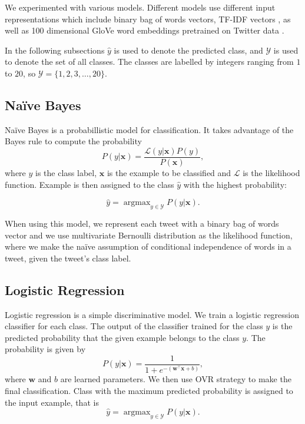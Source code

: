 \documentclass[10pt, a4paper]{article}
\DeclareMathOperator*{\argmax}{argmax}
\begin{document}
We experimented with various models. Different models use different input 
representations which include binary bag of words vectors, TF-IDF vectors 
\citep{manning2008introduction}, as well as 100 dimensional GloVe word 
embeddings pretrained on Twitter data \citep{pennington2014glove}.

In the following subsections $\hat{y}$ is used to denote the predicted class, 
and $\mathcal{Y}$ is used to denote the set of all classes. The classes are 
labelled by integers ranging from $1$ to $20$, so $\mathcal{Y} = \{1, 2, 3,
\ldots, 20\}$.

\subsection{Na\"{i}ve Bayes}

Na\"{i}ve Bayes \citep{manning2008introduction} is a probabillistic model for 
classification. It takes advantage of the Bayes rule to compute the probability 
$$P(y|\mathbf{x}) = \frac{\mathcal{L}(y|\mathbf{x}) P(y)}{P(\mathbf{x})},$$
where $y$ is the class label, $\mathbf{x}$ is the example to be classified and 
$\mathcal{L}$ is the likelihood function. Example is then assigned to the class 
$\hat{y}$ with the highest probability:

$$\hat{y} = \argmax_{y \in \mathcal{Y}} P(y|\mathbf{x}).$$

When using this model, we represent each tweet with a binary bag of words vector
and we use multivariate Bernoulli distribution as the likelihood function, where
we make the na\"{i}ve assumption of conditional independence of words in a 
tweet, given the tweet's class label.

\subsection{Logistic Regression}

Logistic regression \citep{murphy2012machine} is a simple discriminative model.
We train a logistic regression classifier for each class. The output of the 
classifier trained for the class $y$ is the predicted probability that the given
example belongs to the class $y$. The probability is given by
$$P(y|\mathbf{x}) = \frac{1}{1 + e^{-(\mathbf{w}^\top \mathbf{x} + b)}},$$
where $\mathbf{w}$ and $b$ are learned parameters. We then use OVR strategy 
\citep{bishop2006pattern} to make the final classification. Class with the 
maximum predicted probability is assigned to the input example, that is 
$$\hat{y} = \argmax_{y \in \mathcal{Y}} P(y|\mathbf{x}).$$
\end{document}
